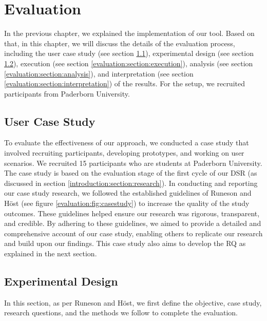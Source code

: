 
\chapter{Evaluation}
\label{chap:evaluation}
In the previous chapter, we explained the implementation of our tool. 
Based on that, in this chapter, we will discuss the details of the evaluation process, including the user case study (see section \ref{evaluation:section:casestudy}), experimental design (see section \ref{evaluation:section:design}), execution (see section \ref{evaluation:section:execution}), analysis (see section \ref{evaluation:section:analysis}), and interpretation (see section \ref{evaluation:section:interpretation}) of the results. 
For the setup, we recruited participants from Paderborn University.
\ifpdf
    \graphicspath{{Chapters/Evaluation/Figs/}{Chapters/Evaluation/Figs/}{Chapters/Evaluation/Figs/}}
\else
    \graphicspath{{Chapters/Evaluation/Figs/}{Chapters/Evaluation/Figs/}}
\fi

\section{User Case Study}
\label{evaluation:section:casestudy}
To evaluate the effectiveness of our approach, we conducted a case study that involved recruiting participants, developing prototypes, and working on user scenarios. 
We recruited 15 participants who are students at Paderborn University. 
The case study is based on the evaluation stage of the first cycle of our DSR (as discussed in section \ref{introduction:section:research}). 
In conducting and reporting our case study research, we followed the established guidelines of Runeson and Höst \cite{eval:guidlines:runeson} (see figure \ref{evaluation:fig:casestudy}) to increase the quality of the study outcomes. 
These guidelines helped ensure our research was rigorous, transparent, and credible. 
By adhering to these guidelines, we aimed to provide a detailed and comprehensive account of our case study, enabling others to replicate our research and build upon our findings.
This case study also aims to develop the RQ as explained in the next section.

\clearpage
\section{Experimental Design}
\label{evaluation:section:design}
In this section, as per Runeson and Höst, we first define the objective, case study, research questions, and the methods we follow to complete the evaluation.

